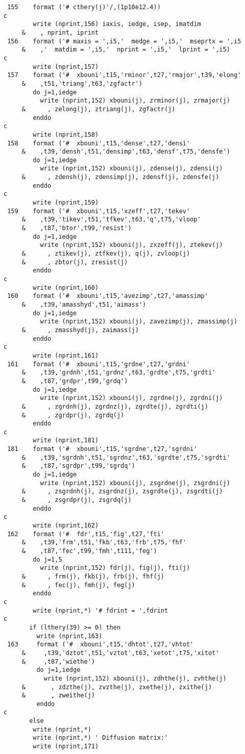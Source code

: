\begin{verbatim}
 155    format ('# cthery(j)'/,(1p10e12.4))
c
        write (nprint,156) iaxis, iedge, isep, imatdim
     &    , nprint, iprint
 156    format ('# maxis = ',i5,'  medge = ',i5,'  mseprtx = ',i5
     &    ,'  matdim = ',i5,'  nprint = ',i5,'  lprint = ',i5)
c
        write (nprint,157)
 157    format ('#  xbouni',t15,'rminor',t27,'rmajor',t39,'elong'
     &    ,t51,'triang',t63,'zgfactr')
        do j=1,iedge
          write (nprint,152) xbouni(j), zrminor(j), zrmajor(j)
     &      , zelong(j), ztriang(j), zgfactr(j)
        enddo
c
        write (nprint,158)
 158    format ('#  xbouni',t15,'dense',t27,'densi'
     &    ,t39,'densh',t51,'densimp',t63,'densf',t75,'densfe')
        do j=1,iedge
          write (nprint,152) xbouni(j), zdense(j), zdensi(j)
     &      , zdensh(j), zdensimp(j), zdensf(j), zdensfe(j)
        enddo
c
        write (nprint,159)
 159    format ('#  xbouni',t15,'xzeff',t27,'tekev'
     &    ,t39,'tikev',t51,'tfkev',t63,'q',t75,'vloop'
     &    ,t87,'btor',t99,'resist')
        do j=1,iedge
          write (nprint,152) xbouni(j), zxzeff(j), ztekev(j)
     &      , ztikev(j), ztfkev(j), q(j), zvloop(j)
     &      , zbtor(j), zresist(j)
        enddo
c
        write (nprint,160)
 160    format ('#  xbouni',t15,'avezimp',t27,'amassimp'
     &    ,t39,'amasshyd',t51,'aimass')
        do j=1,iedge
          write (nprint,152) xbouni(j), zavezimp(j), zmassimp(j)
     &      , zmasshyd(j), zaimass(j)
        enddo
c
        write (nprint,161)
 161    format ('#  xbouni',t15,'grdne',t27,'grdni'
     &    ,t39,'grdnh',t51,'grdnz',t63,'grdte',t75,'grdti'
     &    ,t87,'grdpr',t99,'grdq')
        do j=1,iedge
          write (nprint,152) xbouni(j), zgrdne(j), zgrdni(j)
     &      , zgrdnh(j), zgrdnz(j), zgrdte(j), zgrdti(j)
     &      , zgrdpr(j), zgrdq(j)
        enddo
c
        write (nprint,181)
 181    format ('#  xbouni',t15,'sgrdne',t27,'sgrdni'
     &    ,t39,'sgrdnh',t51,'sgrdnz',t63,'sgrdte',t75,'sgrdti'
     &    ,t87,'sgrdpr',t99,'sgrdq')
        do j=1,iedge
          write (nprint,152) xbouni(j), zsgrdne(j), zsgrdni(j)
     &      , zsgrdnh(j), zsgrdnz(j), zsgrdte(j), zsgrdti(j)
     &      , zsgrdpr(j), zsgrdq(j)
        enddo
c
        write (nprint,162)
 162    format ('#  fdr',t15,'fig',t27,'fti'
     &    ,t39,'frm',t51,'fkb',t63,'frb',t75,'fhf'
     &    ,t87,'fec',t99,'fmh',t111,'feg')
        do j=1,5
          write (nprint,152) fdr(j), fig(j), fti(j)
     &      , frm(j), fkb(j), frb(j), fhf(j)
     &      , fec(j), fmh(j), feg(j)
        enddo
c
        write (nprint,*) '# fdrint = ',fdrint
c
       if (lthery(39) >= 0) then
         write (nprint,163)
 163     format ('#  xbouni',t15,'dhtot',t27,'vhtot'
     &     ,t39,'dztot',t51,'vztot',t63,'xetot',t75,'xitot'
     &     ,t87,'wiethe')
         do j=1,iedge
           write (nprint,152) xbouni(j), zdhthe(j), zvhthe(j)
     &       , zdzthe(j), zvzthe(j), zxethe(j), zxithe(j)
     &       , zweithe(j)
         enddo
c
       else
        write (nprint,*)
        write (nprint,*) ' Diffusion matrix:'
        write (nprint,171)


\end{verbatim}
